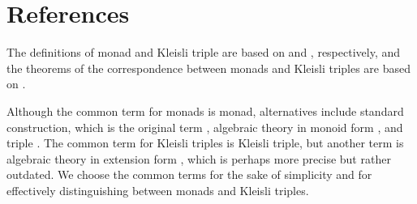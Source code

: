 \section{References}
\label{sec:monads-references}

The definitions of monad and Kleisli triple are based on
\parencite[137]{maclane-1998} and \parencite[58]{moggi-1991},
respectively, and the theorems of the correspondence between monads
and Kleisli triples are based on \parencites[24,
  26--29]{manes-1976}[61]{moggi-1991}.

\begin{terminology}
  \label{ter:monads}

  Although the common term for monads is monad, alternatives include
  standard construction, which is the original term
  \parencite[30]{manes-1976}, algebraic theory in monoid form
  \parencite[29]{manes-1976}, and triple
  \parencites[83]{barr-2005}[372]{barr-wells-2012}. The common term
  for Kleisli triples is Kleisli triple, but another term is algebraic
  theory in extension form \parencite[32]{manes-1976}, which is
  perhaps more precise but rather outdated. We choose the common terms
  for the sake of simplicity and for effectively distinguishing
  between monads and Kleisli triples.

\end{terminology}

\clearemptydoublepage
